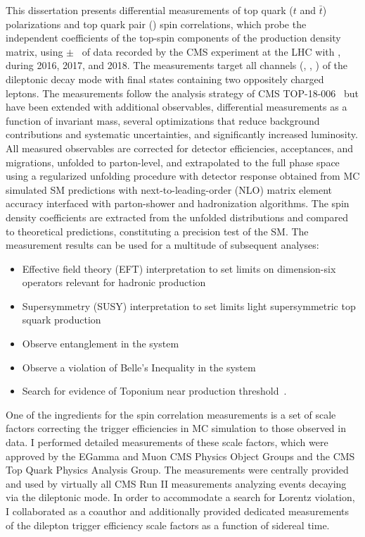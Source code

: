 This dissertation presents differential measurements of top quark ($t$ and $\bar{t}$) polarizations and top quark pair (\ttbar) spin correlations, which probe the independent coefficients of the top-spin components of the \ttbar production density matrix, using \lumivalueRuniiUL $\pm$ \lumierrRuniiUL\ of data recorded by the CMS experiment at the LHC with \beamenergy, during 2016, 2017, and 2018.
The measurements target all channels (\ee, \emu, \mumu) of the \ttbar dileptonic decay mode with final states containing two oppositely charged leptons.
The measurements follow the analysis strategy of CMS TOP-18-006~\cite{Sirunyan:2681777} but have been extended with additional observables, differential measurements as a function of \ttbar invariant mass, several optimizations that reduce background contributions and systematic uncertainties, and significantly increased luminosity.
All measured observables are corrected for detector efficiencies, acceptances, and migrations, unfolded to parton-level, and extrapolated to the full phase space using a regularized unfolding procedure with detector response obtained from MC simulated SM predictions with next-to-leading-order (NLO) matrix element accuracy interfaced with parton-shower and hadronization algorithms.
The spin density coefficients are extracted from the unfolded distributions and compared to theoretical predictions, constituting a precision test of the SM.
The measurement results can be used for a multitude of subsequent analyses:
\begin{itemize}
    \item Effective field theory (EFT) interpretation to set limits on dimension-six operators relevant for hadronic \ttbar production~\cite{Sirunyan:2681777}
    \item Supersymmetry (SUSY) interpretation to set limits light supersymmetric top squark production~\cite{CMS-PAS-FTR-18-034}
    \item Observe entanglement in the \ttbar system~\cite{Afik_2021}
    \item Observe a violation of Belle's Inequality in the \ttbar system~\cite{Aguilar_Saavedra_2022}
    \item Search for evidence of Toponium near \ttbar production threshold~\cite{PhysRevD.104.034023}.
\end{itemize}

One of the ingredients for the \ttbar spin correlation measurements is a set of scale factors correcting the trigger efficiencies in MC simulation to those observed in data.
I performed detailed measurements of these scale factors, which were approved by the EGamma and Muon CMS Physics Object Groups and the CMS Top Quark Physics Analysis Group.
The measurements were centrally provided and used by virtually all CMS Run II measurements analyzing \ttbar events decaying via the dileptonic mode.
In order to accommodate a search for Lorentz violation, I collaborated as a coauthor and additionally provided dedicated measurements of the dilepton trigger efficiency scale factors as a function of sidereal time.

